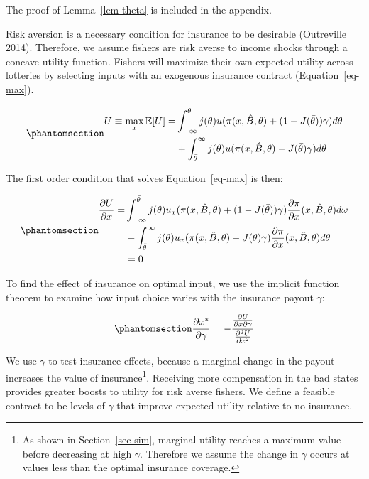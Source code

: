 \documentclass[
  letterpaper,
  DIV=11,
  numbers=noendperiod]{scrartcl}
\theoremstyle{plain}
\theoremstyle{plain}
\theoremstyle{remark}
\begin{document}
The proof of Lemma~\ref{lem-theta} is included in the appendix.

Risk aversion is a necessary condition for insurance to be desirable
(Outreville 2014). Therefore, we assume fishers are risk averse to
income shocks through a concave utility function. Fishers will maximize
their own expected utility across lotteries by selecting inputs with an
exogenous insurance contract (Equation~\ref{eq-max}).

\begin{equation}\phantomsection\label{eq-max}{
\begin{aligned}
U\equiv\max_{x}\mathbb{E}[U]=& \int^{\bar \theta}_{-\infty}j(\theta)u(\pi(x,\hat{B},\theta)+(1-J(\bar \theta))\gamma)d\theta\\
&+\int^{\infty}_{\bar{\theta}}j(\theta) u(\pi(x,\hat{B},
\theta)-J(\bar \theta)\gamma)d \theta
\end{aligned}
}\end{equation}

The first order condition that solves Equation~\ref{eq-max} is then:

\begin{equation}\phantomsection\label{eq-foc1}{
\begin{aligned}
\frac{\partial U}{\partial x}=&\int^{\bar \theta}_{-\infty}j(\theta)u_{x}(\pi(x,\hat{B},\theta)+(1-J(\bar \theta))\gamma)\frac{\partial \pi}{\partial x}(x,\hat{B},\theta)d\omega\\
&+\int^{\infty}_{\bar{\theta}}j(\theta) u_{x}(\pi(x,\hat{B},\theta)-J(\bar \theta)\gamma)\frac{\partial \pi}{\partial x}(x,\hat{B},\theta) d\theta\\
&=0
\end{aligned}
}\end{equation}

To find the effect of insurance on optimal input, we use the implicit
function theorem to examine how input choice varies with the insurance
payout \(\gamma\):

\begin{equation}\phantomsection\label{eq-ivt}{
\frac{\partial x^{*}}{\partial \gamma}=-\frac{\frac{\partial U}{\partial x \partial \gamma}}{\frac{\partial^2 U}{\partial x^{2}}}
}\end{equation}

We use \(\gamma\) to test insurance effects, because a marginal change
in the payout increases the value of insurance\footnote{As shown in
  Section~\ref{sec-sim}, marginal utility reaches a maximum value before
  decreasing at high \(\gamma\). Therefore we assume the change in
  \(\gamma\) occurs at values less than the optimal insurance coverage.}.
Receiving more compensation in the bad states provides greater boosts to
utility for risk averse fishers. We define a feasible contract to be
levels of \(\gamma\) that improve expected utility relative to no
insurance.
\end{document}
